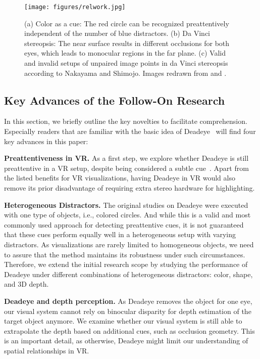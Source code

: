 \documentclass[journal]{vgtc}                %
\begin{document}
\begin{figure*}[t!]
\centering
\texttt{[image: figures/relwork.jpg]}
\caption{(a) Color as a cue: The red circle can be recognized preattentively independent of the number of blue distractors. (b) Da Vinci stereopsis: The near surface results in different occlusions for both eyes, which leads to monocular regions in the far plane. (c) Valid and invalid setups of unpaired image points in da Vinci stereopsis according to Nakayama and Shimojo\protect\cite{NAKAYAMA19901811}. Images redrawn from \protect\cite{ASSEE20072585} and \protect\cite{krekhov2019deadeye}.}
\label{fig:relwork}
\end{figure*}



\subsection{Key Advances of the Follow-On Research}

In this section, we briefly outline the key novelties to facilitate comprehension. Especially readers that are familiar with the basic idea of Deadeye~\cite{krekhov2019deadeye} will find four key advances in this paper:


\textbf{Preattentiveness in VR.} As a first step, we explore whether Deadeye is still preattentive in a VR setup, despite being considered a subtle cue~\cite{zou2017binocularity}. Apart from the listed benefits for VR visualizations, having Deadeye in VR would also remove its prior disadvantage of requiring extra stereo hardware for highlighting.


\textbf{Heterogeneous Distractors.} The original studies on Deadeye were executed with one type of objects, i.e., colored circles. And while this is a valid and most commonly used approach for detecting preattentive cues, it is not guaranteed that these cues perform equally well in a heterogeneous setup with varying distractors. As visualizations are rarely limited to homogeneous objects, we need to assure that the method maintains its robustness under such circumstances. Therefore, we extend the initial research scope by studying the performance of Deadeye under different combinations of heterogeneous distractors: color, shape, and 3D depth.



\textbf{Deadeye and depth perception.} As Deadeye removes the object for one eye, our visual system cannot rely on binocular disparity for depth estimation of the target object anymore. We examine whether our visual system is still able to extrapolate the depth based on additional cues, such as occlusion geometry. This is an important detail, as otherwise, Deadeye might limit our understanding of spatial relationships in VR.
\end{document}
